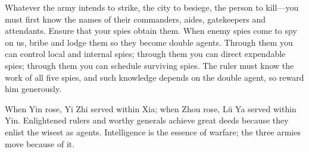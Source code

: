 \documentclass[12pt]{book}
\begin{document}
{Whatever the army intends to strike, the city to besiege, the person to kill—you must first know the names of their commanders, aides, gatekeepers and attendants. Ensure that your spies obtain them. When enemy spies come to spy on us, bribe and lodge them so they become double agents. Through them you can control local and internal spies; through them you can direct expendable spies; through them you can schedule surviving spies. The ruler must know the work of all five spies, and such knowledge depends on the double agent, so reward him generously.

When Yin rose, Yi Zhi served within Xia; when Zhou rose, Lü Ya served within Yin. Enlightened rulers and worthy generals achieve great deeds because they enlist the wisest as agents. Intelligence is the essence of warfare; the three armies move because of it.}
\end{document}
